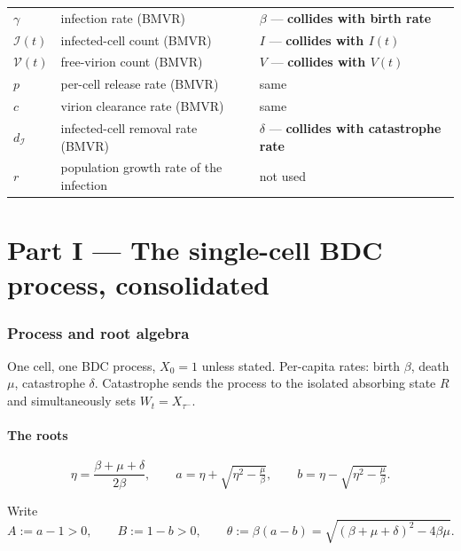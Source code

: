 \documentclass[11pt]{article}
\newcommand{\wt}{W_t}
\newcommand{\Icell}{\mathcal{I}}
\newcommand{\Vfree}{\mathcal{V}}
\newcommand{\Aa}{A}
\newcommand{\Bb}{B}
\theoremstyle{plain}
\theoremstyle{definition}
\theoremstyle{remark}
\begin{document}
\begin{center}
\begin{tabular}{@{}llp{}@{}}
$\gamma$ & infection rate (BMVR) & $\beta$ --- \textbf{collides with birth rate} \\
$\Icell(t)$ & infected-cell count (BMVR) & $I$ --- \textbf{collides with $I(t)$} \\
$\Vfree(t)$ & free-virion count (BMVR) & $V$ --- \textbf{collides with $V(t)$} \\
$p$ & per-cell release rate (BMVR) & same \\
$c$ & virion clearance rate (BMVR) & same \\
$d_{\Icell}$ & infected-cell removal rate (BMVR) & $\delta$ --- \textbf{collides with catastrophe rate} \\
$r$ & population growth rate of the infection & not used \\
\bottomrule
\end{tabular}
\end{center}

\part*{Part I --- The single-cell BDC process, consolidated}

\section{Process and root algebra}

One cell, one BDC process, $X_0=1$ unless stated. Per-capita rates: birth $\beta$,
death $\mu$, catastrophe $\delta$. Catastrophe sends the process to the isolated
absorbing state $R$ and simultaneously sets $\wt=X_{\tau^-}$.

\subsection{The roots}

\begin{equation}
\eta=\frac{\beta+\mu+\delta}{2\beta},\qquad
a=\eta+\sqrt{\eta^2-\tfrac{\mu}{\beta}},\qquad
b=\eta-\sqrt{\eta^2-\tfrac{\mu}{\beta}} .
\end{equation}

Write
\begin{equation}
\Aa:=a-1>0,\qquad \Bb:=1-b>0,\qquad \theta:=\beta(a-b)=\sqrt{(\beta+\mu+\delta)^2-4\beta\mu}.
\end{equation}
\end{document}
